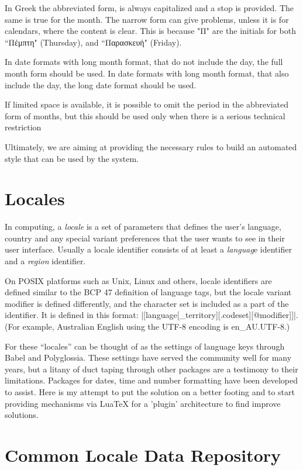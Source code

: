 In Greek the abbreviated form, is always capitalized and a stop is provided. The same is true for the month. The narrow form can give problems, unless it is for calendars, where the content is clear. This is because "{\panunicode Π}" are the initials for both ``{\panunicode Πέμπτη}" (Thursday), and ``{\panunicode Παρασκευή}" (Friday). 

In date formats with long month format, that do not include the day, the full month form should be used.
In date formats with long month format, that also include the day, the long date format should be used.

If limited space is available, it is possible to omit the period in the abbreviated form of months, but this should be used only when there is a serious technical restriction

Ultimately, we are aiming at providing the necessary rules to build an automated style that can be used by the system.
                

\section{Locales}

In computing, a \emph{locale} is a set of parameters that defines the user's language, country and any special variant preferences that the user wants to see in their user interface. Usually a locale identifier consists of at least a \textit{languag}e identifier and a \textit{region} identifier.

On POSIX platforms such as Unix, Linux and others, locale identifiers are defined similar to the BCP 47 definition of language tags, but the locale variant modifier is defined differently, and the character set is included as a part of the identifier. It is defined in this format: |[language[_territory][.codeset][@modifier]]|. (For example, Australian English using the UTF-8 encoding is en\_AU.UTF-8.)

For \latex these ``locales'' can be thought of as the settings of language keys through Babel and Polyglossia. These settings have served the community well for many years, but a litany of duct taping through other packages are a testimony to their limitations. Packages for dates, time and number formatting have been developed to assist. Here is my attempt to put the solution on a better footing and to start providing mechanisms via LuaTeX for a 'plugin'
architecture to find improve solutions. 

\section{Common Locale Data Repository}


